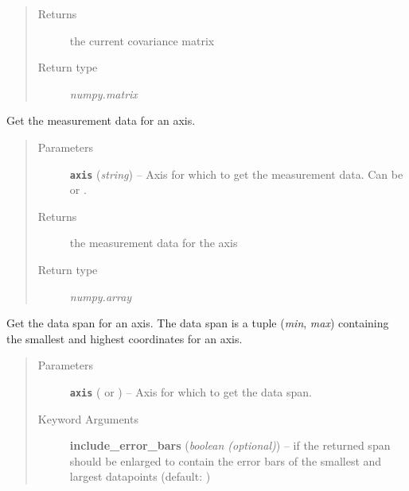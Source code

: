 \documentclass[a4paper,10pt,english]{sphinxmanual}
\begin{document}
\begin{fulllineitems}
\begin{fulllineitems}
\begin{quote}
\begin{description}
\item[{Returns}] \leavevmode
the current covariance matrix

\item[{Return type}] \leavevmode
\emph{numpy.matrix}

\end{description}\end{quote}

\end{fulllineitems}


\begin{fulllineitems}
\label{index:kafe.dataset.Dataset.get_data}
Get the measurement data for an axis.
\begin{quote}\begin{description}
\item[{Parameters}] \leavevmode
\textbf{\texttt{axis}} (\emph{string}) -- Axis for which to get the measurement data. Can be  or
.

\item[{Returns}] \leavevmode
the measurement data for the axis

\item[{Return type}] \leavevmode
\emph{numpy.array}

\end{description}\end{quote}

\end{fulllineitems}


\begin{fulllineitems}
\label{index:kafe.dataset.Dataset.get_data_span}
Get the data span for an axis. The data span is a tuple (\emph{min}, \emph{max})
containing the smallest and highest coordinates for an axis.
\begin{quote}\begin{description}
\item[{Parameters}] \leavevmode
\textbf{\texttt{axis}} ( or ) -- Axis for which to get the data span.

\item[{Keyword Arguments}] \leavevmode
\textbf{include\_error\_bars} (\emph{boolean (optional)}) --
 if the returned span should be enlarged to
contain the error bars of the smallest and largest datapoints
(default: )


\end{description}
\end{quote}
\end{fulllineitems}
\end{fulllineitems}
\end{document}
